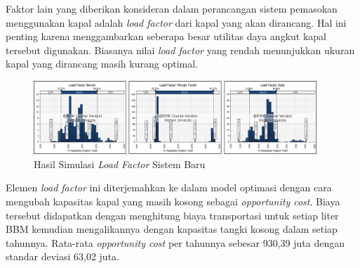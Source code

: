 Faktor lain yang diberikan konsideran dalam perancangan sistem pemasokan menggunakan kapal adalah \emph{load factor} dari kapal yang akan dirancang. Hal ini penting karena menggambarkan seberapa besar utilitas daya angkut kapal tersebut digunakan. Biasanya nilai \emph{load factor} yang rendah menunjukkan ukuran kapal yang dirancang masih kurang optimal.

\begin{figure}[!ht]
    \centering
    \includegraphics[width=0.95\textwidth]{grafik/load-factor-baru-tangki.jpg}
    \caption{Hasil Simulasi \emph{Load Factor} Sistem Baru}
    \label{fig:load-factor-new-tangki}
\end{figure}

Elemen \emph{load factor} ini diterjemahkan ke dalam model optimasi dengan cara mengubah kapasitas kapal yang masih kosong sebagai \emph{opportunity cost}. Biaya tersebut didapatkan dengan menghitung biaya transportasi untuk setiap liter BBM kemudian mengalikannya dengan kapasitas tangki kosong dalam setiap tahunnya. Rata-rata \emph{opportunity cost} per tahunnya sebesar 930,39 juta dengan standar deviasi 63,02 juta.
